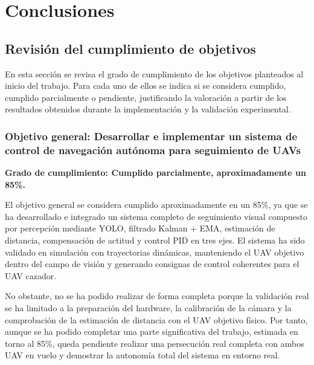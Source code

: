 \clearpage

\chapter*{Conclusiones}

\vspace{-1.5cm} 
\noindent\HRule\par\vspace{0.1cm}

\section{Revisión del cumplimiento de objetivos}

En esta sección se revisa el grado de cumplimiento de los objetivos planteados al inicio del trabajo. Para cada uno de ellos se indica si se considera cumplido, cumplido parcialmente o pendiente, justificando la valoración a partir de los resultados obtenidos durante la implementación y la validación experimental.

\vspace{0.3cm}

\subsection*{\textbf{Objetivo general: Desarrollar e implementar un sistema de control de navegación autónoma para seguimiento de UAVs}}

\textbf{Grado de cumplimiento: Cumplido parcialmente, aproximadamente un 85\%.}

El objetivo general se considera cumplido aproximadamente en un 85\%, ya que se ha desarrollado e integrado un sistema completo de seguimiento visual compuesto por percepción mediante YOLO, filtrado Kalman + EMA, estimación de distancia, compensación de actitud y control PID en tres ejes. El sistema ha sido validado en simulación con trayectorias dinámicas, manteniendo el UAV objetivo dentro del campo de visión y generando consignas de control coherentes para el UAV cazador.

\vspace{0.2cm}

No obstante, no se ha podido realizar de forma completa porque la validación real se ha limitado a la preparación del hardware, la calibración de la cámara y la comprobación de la estimación de distancia con el UAV objetivo físico. Por tanto, aunque se ha podido completar una parte significativa del trabajo, estimada en torno al 85\%, queda pendiente realizar una persecución real completa con ambos UAV en vuelo y demostrar la autonomía total del sistema en entorno real.

